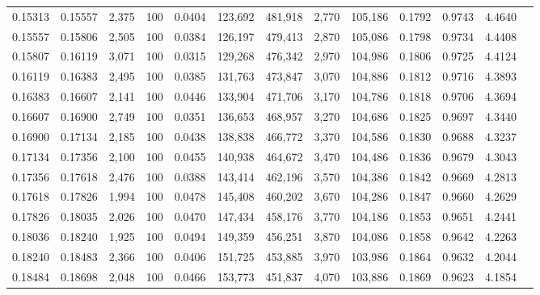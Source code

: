\begin{tabular}{rrrrrrrrrrrrr}
0.15313 & 0.15557 & 2,375 & 100 &                                     0.0404 & 123,692 & 481,918 &   2,770 & 105,186 & 0.1792 & 0.9743 & 4.4640 \\
0.15557 & 0.15806 & 2,505 & 100 &                                     0.0384 & 126,197 & 479,413 &   2,870 & 105,086 & 0.1798 & 0.9734 & 4.4408 \\
0.15807 & 0.16119 & 3,071 & 100 &                                     0.0315 & 129,268 & 476,342 &   2,970 & 104,986 & 0.1806 & 0.9725 & 4.4124 \\
0.16119 & 0.16383 & 2,495 & 100 &                                     0.0385 & 131,763 & 473,847 &   3,070 & 104,886 & 0.1812 & 0.9716 & 4.3893 \\
0.16383 & 0.16607 & 2,141 & 100 &                                     0.0446 & 133,904 & 471,706 &   3,170 & 104,786 & 0.1818 & 0.9706 & 4.3694 \\
0.16607 & 0.16900 & 2,749 & 100 &                                     0.0351 & 136,653 & 468,957 &   3,270 & 104,686 & 0.1825 & 0.9697 & 4.3440 \\
0.16900 & 0.17134 & 2,185 & 100 &                                     0.0438 & 138,838 & 466,772 &   3,370 & 104,586 & 0.1830 & 0.9688 & 4.3237 \\
0.17134 & 0.17356 & 2,100 & 100 &                                     0.0455 & 140,938 & 464,672 &   3,470 & 104,486 & 0.1836 & 0.9679 & 4.3043 \\
0.17356 & 0.17618 & 2,476 & 100 &                                     0.0388 & 143,414 & 462,196 &   3,570 & 104,386 & 0.1842 & 0.9669 & 4.2813 \\
0.17618 & 0.17826 & 1,994 & 100 &                                     0.0478 & 145,408 & 460,202 &   3,670 & 104,286 & 0.1847 & 0.9660 & 4.2629 \\
0.17826 & 0.18035 & 2,026 & 100 &                                     0.0470 & 147,434 & 458,176 &   3,770 & 104,186 & 0.1853 & 0.9651 & 4.2441 \\
0.18036 & 0.18240 & 1,925 & 100 &                                     0.0494 & 149,359 & 456,251 &   3,870 & 104,086 & 0.1858 & 0.9642 & 4.2263 \\
0.18240 & 0.18483 & 2,366 & 100 &                                     0.0406 & 151,725 & 453,885 &   3,970 & 103,986 & 0.1864 & 0.9632 & 4.2044 \\
0.18484 & 0.18698 & 2,048 & 100 &                                     0.0466 & 153,773 & 451,837 &   4,070 & 103,886 & 0.1869 & 0.9623 & 4.1854 \\

\end{tabular}
